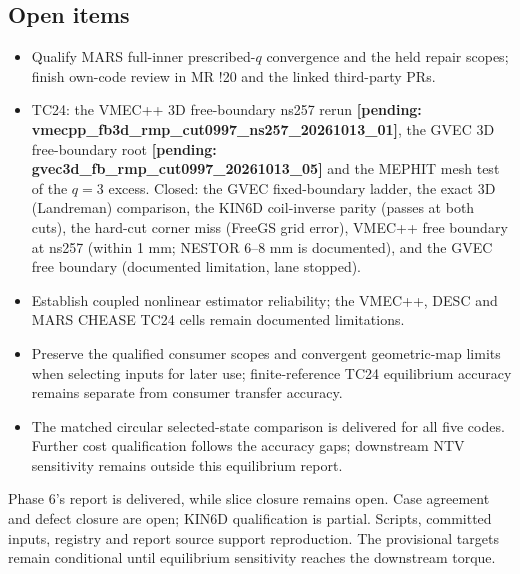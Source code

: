 \documentclass[10pt,a4paper]{article}
\newcommand{\pending}[1]{\textcolor{red!70!black}{\textbf{[pending: #1]}}}
\begin{document}
\subsection*{Open items}
\begin{itemize}
\item Qualify MARS full-inner prescribed-$q$ convergence and the held repair scopes; finish
own-code review in MR !20 and the linked third-party PRs.
\item TC24: the VMEC++ 3D free-boundary ns257 rerun
\pending{vmecpp\_\allowbreak{}fb3d\_\allowbreak{}rmp\_\allowbreak{}cut0997\_\allowbreak{}ns257\_\allowbreak{}20261013\_\allowbreak{}01},
the GVEC 3D free-boundary root
\pending{gvec3d\_\allowbreak{}fb\_\allowbreak{}rmp\_\allowbreak{}cut0997\_\allowbreak{}20261013\_\allowbreak{}05}
and the MEPHIT mesh test of the $q=3$ excess. Closed: the GVEC fixed-boundary ladder, the exact 3D
(Landreman) comparison, the KIN6D coil-inverse parity (passes at both cuts), the hard-cut corner miss
(FreeGS grid error), VMEC++ free boundary at ns257 (within 1 mm; NESTOR 6--8 mm is documented), and the GVEC free boundary
(documented limitation, lane stopped).
\item Establish coupled nonlinear estimator reliability; the VMEC++, DESC and MARS CHEASE
TC24 cells remain documented limitations.
\item Preserve the qualified consumer scopes and convergent geometric-map
limits when selecting inputs for later use; finite-reference TC24 equilibrium
accuracy remains separate from consumer transfer accuracy.
\item The matched circular selected-state comparison is delivered for all five codes.
Further cost qualification follows the accuracy gaps; downstream NTV sensitivity
remains outside this equilibrium report.
\end{itemize}

Phase 6's report is delivered, while slice closure remains open. Case agreement
and defect closure are open; KIN6D qualification is partial. Scripts, committed
inputs, registry and report source support reproduction. The provisional targets
remain conditional until equilibrium sensitivity reaches the downstream torque.
\end{document}
